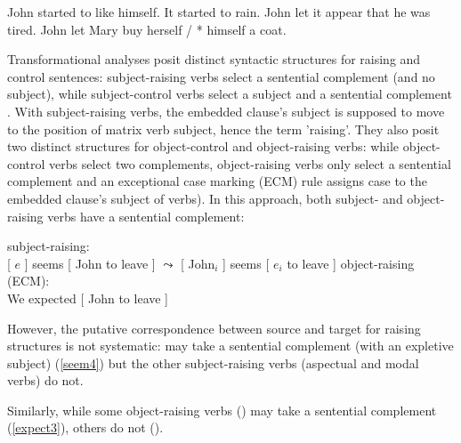 \documentclass[output=paper
	        ,collection
	        ,collectionchapter
 	        ,biblatex
                ,babelshorthands
                ,newtxmath
                ,draftmode
                ,colorlinks, citecolor=brown
]{langscibook}
\begin{document}
	\begin{exe}
\ex  \begin{xlist}
\ex John started to like himself.
\ex It started to rain.
\ex John let it appear that he was tired.
\ex John let Mary buy herself / * himself a coat.
	 \end{xlist}
	 \end{exe}
	

Transformational analyses posit distinct syntactic structures for raising and control sentences: subject-raising verbs select a sentential complement (and no subject), while subject-control verbs select a subject and a sentential complement \citep{Postal1974, Chomsky81a}. With subject-raising verbs, the embedded clause's subject is supposed to move to the position of matrix verb subject, hence the  term 'raising'. They also posit two distinct structures for object-control and object-raising verbs: while object-control verbs select two complements, object-raising verbs only select a sentential complement and
an exceptional case marking (ECM) rule assigns case to the embedded clause's subject of  verbs).
In this approach, both subject- and object-raising verbs have a sentential complement:
	
\eal
\ex subject-raising:\\
{}[ $e$ ] seems [ John to leave ] 
$\leadsto$  
{}[ John$_{i}$ ] seems [ $e_{i}$ to leave ]	
\ex object-raising (ECM):\\
We expected [ John to leave ] 	
\zl

However, the putative correspondence between source and target for raising structures is not systematic:  may take a sentential complement (with an expletive subject) (\ref{seem4}) but the other subject-raising verbs (aspectual and modal verbs) do not. 


\eal
{}
\zl
 
Similarly, while some object-raising verbs () may take a sentential complement (\ref{expect3}), others do not ().
 
\end{document}
